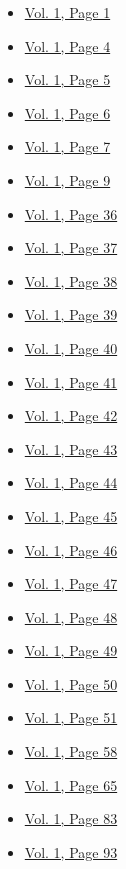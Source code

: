 \begin{itemize}
  \begin{itemize}
  \tightlist
  \item
    \protect\hyperlink{g-page-9}{Vol. 1, Page 1}
  \item
    \protect\hyperlink{g-page-12}{Vol. 1, Page 4}
  \item
    \protect\hyperlink{g-page-13}{Vol. 1, Page 5}
  \item
    \protect\hyperlink{g-page-14}{Vol. 1, Page 6}
  \item
    \protect\hyperlink{g-page-15}{Vol. 1, Page 7}
  \item
    \protect\hyperlink{g-page-17}{Vol. 1, Page 9}
  \item
    \protect\hyperlink{g-page-44}{Vol. 1, Page 36}
  \item
    \protect\hyperlink{g-page-45}{Vol. 1, Page 37}
  \item
    \protect\hyperlink{g-page-46}{Vol. 1, Page 38}
  \item
    \protect\hyperlink{g-page-47}{Vol. 1, Page 39}
  \item
    \protect\hyperlink{g-page-48}{Vol. 1, Page 40}
  \item
    \protect\hyperlink{g-page-49}{Vol. 1, Page 41}
  \item
    \protect\hyperlink{g-page-50}{Vol. 1, Page 42}
  \item
    \protect\hyperlink{g-page-51}{Vol. 1, Page 43}
  \item
    \protect\hyperlink{g-page-52}{Vol. 1, Page 44}
  \item
    \protect\hyperlink{g-page-53}{Vol. 1, Page 45}
  \item
    \protect\hyperlink{g-page-54}{Vol. 1, Page 46}
  \item
    \protect\hyperlink{g-page-55}{Vol. 1, Page 47}
  \item
    \protect\hyperlink{g-page-56}{Vol. 1, Page 48}
  \item
    \protect\hyperlink{g-page-57}{Vol. 1, Page 49}
  \item
    \protect\hyperlink{g-page-58}{Vol. 1, Page 50}
  \item
    \protect\hyperlink{g-page-59}{Vol. 1, Page 51}
  \item
    \protect\hyperlink{g-page-66}{Vol. 1, Page 58}
  \item
    \protect\hyperlink{g-page-73}{Vol. 1, Page 65}
  \item
    \protect\hyperlink{g-page-91}{Vol. 1, Page 83}
  \item
    \protect\hyperlink{g-page-101}{Vol. 1, Page 93}

\end{itemize}
\end{itemize}
